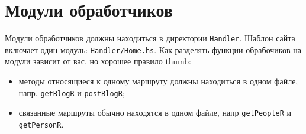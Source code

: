 \section{Модули обработчиков}

Модули обработчиков должны находиться в директории \texttt{Handler}. Шаблон сайта включает один
модуль: \texttt{Handler/Home.hs}. Как разделять функции обрабочиков на модули зависит от вас, но
хорошее правило thumb:
\begin{itemize}
    \item методы относящиеся к одному маршруту должны находиться в одном файле, напр. \lstinline!getBlogR!
          и \lstinline!postBlogR!;
    \item связанные маршруты обычно находятся в одном файле, напр \lstinline!getPeopleR! и \lstinline!getPersonR!.
\end{itemize}

